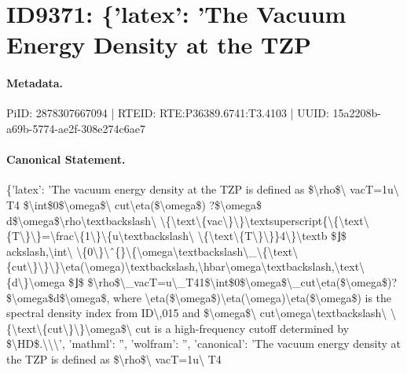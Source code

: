 \section*{ID9371: \{'latex': 'The Vacuum Energy Density at the TZP}
\paragraph{Metadata.}
PiID: 2878307667094 | RTEID: RTE:P36389.6741:T3.4103 | UUID: 15a2208b-a69b-5774-ae2f-308e274c6ae7

\paragraph{Canonical Statement.}
\{'latex': 'The vacuum energy density at the TZP is defined as \$\textbackslash{}rho\$\textbackslash{} vacT=1u\textbackslash{} T4 \$\textbackslash{}int\$0\$\textbackslash{}omega\$\textbackslash{} cut\textbackslash{}eta(\$\textbackslash{}omega\$) ?\$\textbackslash{}omega\$ d\$\textbackslash{}omega\$\textbackslash{}rho\textbackslash{}textbackslash\textbackslash{} \textbackslash{}\{\textbackslash{}text\textbackslash{}\{vac\textbackslash{}\}\textbackslash{}\}\textbackslash{}textsuperscript\{\textbackslash{}\{\textbackslash{}text\textbackslash{}\{T\textbackslash{}\}\textbackslash{}\}=\textbackslash{}frac\textbackslash{}\{1\textbackslash{}\}\textbackslash{}\{u\textbackslash{}textbackslash\textbackslash{} \textbackslash{}\{\textbackslash{}text\textbackslash{}\{T\textbackslash{}\}\textbackslash{}\}\}4\textbackslash{}\}\textbackslash{}textb \$⌋\$ ackslash,\textbackslash{}int\textbackslash{} \textbackslash{}\{0\textbackslash{}\}\textbackslash{}ˆ\{\}\textbackslash{}\{\textbackslash{}omega\textbackslash{}textbackslash\textbackslash{}\_\textbackslash{}\{\textbackslash{}text\textbackslash{}\{cut\textbackslash{}\}\textbackslash{}\}\textbackslash{}\}\textbackslash{}eta(\textbackslash{}omega)\textbackslash{}textbackslash,\textbackslash{}hbar\textbackslash{}omega\textbackslash{}textbackslash,\textbackslash{}text\textbackslash{}\{d\textbackslash{}\}\textbackslash{}omega \$⌋\$ \$\textbackslash{}rho\$\textbackslash{}\_vacT=u\textbackslash{}\_T41\$\textbackslash{}int\$0\$\textbackslash{}omega\$\textbackslash{}\_cut\textbackslash{}eta(\$\textbackslash{}omega\$)?\$\textbackslash{}omega\$d\$\textbackslash{}omega\$, where \textbackslash{}eta(\$\textbackslash{}omega\$)\textbackslash{}eta(\textbackslash{}omega)\textbackslash{}eta(\$\textbackslash{}omega\$) is the spectral density index from ID\textbackslash{},015 and \$\textbackslash{}omega\$\textbackslash{} cut\textbackslash{}omega\textbackslash{}textbackslash\textbackslash{} \textbackslash{}\{\textbackslash{}text\textbackslash{}\{cut\textbackslash{}\}\textbackslash{}\}\textbackslash{}omega\$\textbackslash{} cut is a high-frequency cutoff determined by \$\textbackslash{}HD\$.\textbackslash{}\textbackslash{}\textbackslash{}', 'mathml': '', 'wolfram': '', 'canonical': 'The vacuum energy density at the TZP is defined as \$\textbackslash{}rho\$\textbackslash{} vacT=1u\textbackslash{} T4

